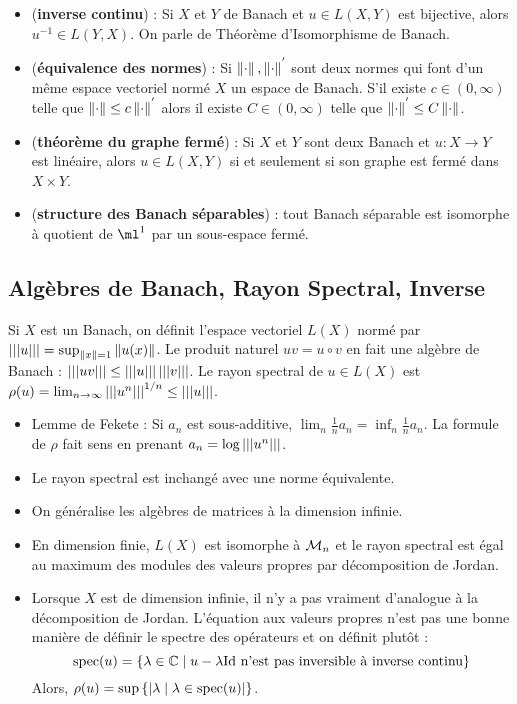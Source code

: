 \documentclass{cours}
\begin{document}
\begin{corollary}
    \begin{itemize}
        \item (\textbf{inverse continu}) : Si $X$ et $Y$ de Banach et $u\in L(X, Y)$ est bijective, alors $u^{-1} \in L(Y, X)$. On parle de Théorème d'Isomorphisme de Banach.
        \item (\textbf{équivalence des normes}) : Si $\left\lVert \cdot \right\rVert, \left\lVert \cdot \right\rVert^{'}$ sont deux normes qui font d'un même espace vectoriel normé $X$ un espace de Banach. S'il existe $c \in \left(0, \infty\right)$ telle que $\left\lVert \cdot \right\rVert \leq c\left\lVert \cdot \right\rVert^{'}$ alors il existe $C \in \left(0, \infty\right)$ telle que $\left\lVert \cdot \right\rVert^{'} \leq C \left\lVert \cdot \right\rVert$.
        \item (\textbf{théorème du graphe fermé}) : Si $X$ et $Y$ sont deux Banach et $u : X \to Y$ est linéaire, alors $u \in L(X, Y)$ si et seulement si son graphe est fermé dans $X \times Y$.
        \item (\textbf{structure des Banach séparables}) : tout Banach séparable est isomorphe à quotient de $\ml^{1}$ par un sous-espace fermé.
    \end{itemize}
\end{corollary}

\subsection{Algèbres de Banach, Rayon Spectral, Inverse}
\begin{definition}
    Si $X$ est un Banach, on définit l'espace vectoriel $L(X)$ normé par $\left| \left| \left| u \right| \right| \right| = \sup_{\left\lVert x \right\rVert = 1} \left\lVert u(x) \right\rVert$. Le produit naturel $uv = u \circ v$ en fait une algèbre de Banach : $\left| \left| \left| uv \right| \right| \right| \leq \left| \left| \left| u \right| \right| \right| \left| \left| \left| v \right| \right| \right|$. Le rayon spectral de $u \in L(X)$ est $\rho(u) = \lim_{n \to \infty} \left| \left| \left| u^{n} \right| \right| \right|^{1/n} \leq \left| \left| \left| u \right| \right| \right|$.
\end{definition}
\begin{remark}
    \begin{itemize}
        \item Lemme de Fekete : Si $a_{n}$ est sous-additive, $\lim_{n} \frac{1}{n} a_{n} = \inf_{n} \frac{1}{n} a_{n}$. La formule de $\rho$ fait sens en prenant $a_{n} = \log \left| \left| \left| u^{n} \right| \right| \right|$.
        \item Le rayon spectral est inchangé avec une norme équivalente.
        \item On généralise les algèbres de matrices à la dimension infinie.
        \item En dimension finie, $L(X)$ est isomorphe à $\mathcal{M}_{n}$ et le rayon spectral est égal au maximum des modules des valeurs propres par décomposition de Jordan.
        \item Lorsque $X$ est de dimension infinie, il n'y a pas vraiment d'analogue à la décomposition de Jordan. L'équation aux valeurs propres n'est pas une bonne manière de définir le spectre des opérateurs et on définit plutôt : \[\text{spec}(u) = \left\{\lambda \in \mathbb{C} \mid u - \lambda\mathrm{Id} \text{ n'est pas inversible à inverse continu} \right\}\] Alors, $\rho(u) = \sup \left\{\left|\lambda \mid \lambda \in \text{spec}(u)\right|\right\}$.
    \end{itemize}
\end{remark}
\end{document}
